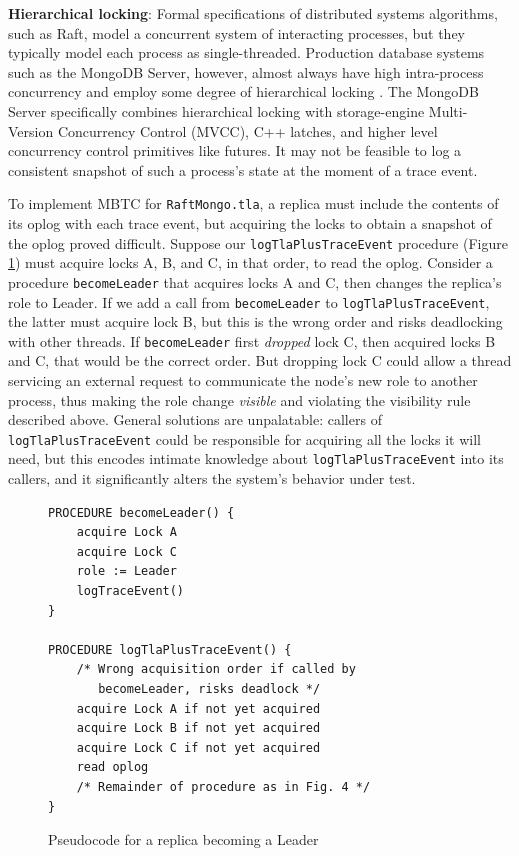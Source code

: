 \documentclass{vldb}
\begin{document}
\textbf{Hierarchical locking}: Formal specifications of distributed systems algorithms, such as Raft, model a concurrent system of interacting processes, but they typically model each process as single-threaded. 
Production database systems such as the MongoDB Server, however, almost always have high intra-process concurrency and employ some degree of hierarchical locking \cite{Gray76SharedLocks}. 
The MongoDB Server specifically combines hierarchical locking with storage-engine Multi-Version Concurrency Control (MVCC), C++ latches, and higher level concurrency control primitives like futures.
It may not be feasible to log a consistent snapshot of such a process's state at the moment of a trace event.


To implement MBTC for \texttt{RaftMongo.tla}, a replica must include the contents of its oplog with each trace event,
but acquiring the locks to obtain a snapshot of the oplog proved difficult. 
Suppose our \texttt{logTlaPlusTraceEvent} procedure (Figure \ref{fig:logTlaPlusTraceEvent}) must acquire locks A, B, and C, in that order, to read the oplog.
Consider a procedure \texttt{becomeLeader} that acquires locks A and C, then changes the replica's role to Leader. 
If we add a call from \texttt{becomeLeader} to \texttt{logTlaPlusTraceEvent}, the latter must acquire lock B, but this is the wrong order and risks deadlocking with other threads.
If \texttt{becomeLeader} first \textit{dropped} lock C, then acquired locks B and C, that would be the correct order.
But dropping lock C could allow a thread servicing an external request to communicate the node's new role to another process, thus making the role change \textit{visible} and violating the visibility rule described above.
General solutions are unpalatable: callers of \texttt{logTlaPlusTraceEvent} could be responsible for acquiring all the locks it will need, but this encodes intimate knowledge about \texttt{logTlaPlusTraceEvent} into its callers, and it significantly alters the system's behavior under test.

\begin{figure}
\begin{verbatim}
PROCEDURE becomeLeader() {
    acquire Lock A
    acquire Lock C
    role := Leader
    logTraceEvent()
}

PROCEDURE logTlaPlusTraceEvent() {
    /* Wrong acquisition order if called by
       becomeLeader, risks deadlock */
    acquire Lock A if not yet acquired
    acquire Lock B if not yet acquired
    acquire Lock C if not yet acquired
    read oplog
    /* Remainder of procedure as in Fig. 4 */
}
\end{verbatim}
\caption{Pseudocode for a replica becoming a Leader}
\label{fig:logTlaPlusTraceEvent}
\end{figure}
\end{document}
